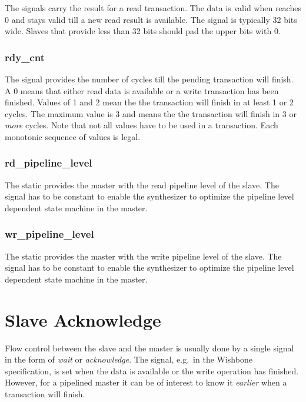 The  signals carry the result for a read transaction.
The data is valid when  reaches 0 and stays valid
till a new read result is available. The signal is typically 32 bits
wide. Slaves that provide less than 32 bits should pad the upper
bits with 0.

\subsubsection{rdy\_cnt}

The  signal provides the number of cycles till the
pending transaction will finish. A 0 means that either read data is
available or a write transaction has been finished. Values of 1 and
2 mean the the transaction will finish in at least 1 or 2 cycles.
The maximum value is 3 and means the the transaction will finish in
3 or \emph{more} cycles. Note that not all values have to be used in
a transaction. Each monotonic sequence of  values is
legal.

\subsubsection{rd\_pipeline\_level}

The static  provides the master with the
read pipeline level of the slave. The signal has to be constant to
enable the synthesizer to optimize the pipeline level dependent
state machine in the master.


\subsubsection{wr\_pipeline\_level}

The static  provides the master with the
write pipeline level of the slave. The signal has to be constant to
enable the synthesizer to optimize the pipeline level dependent
state machine in the master.

\section{Slave Acknowledge}
\label{sec:ack}

Flow control between the slave and the master is usually done by a
single signal in the form of \emph{wait} or \emph{acknowledge}. The
 signal, e.g.\ in the Wishbone specification, is set when
the data is available or the write operation has finished. However,
for a pipelined master it can be of interest to know it
\emph{earlier} when a transaction will finish.


